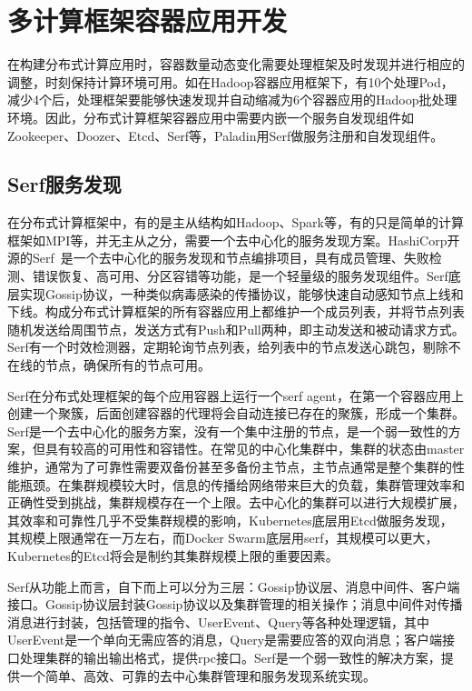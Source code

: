 \section{多计算框架容器应用开发}
在构建分布式计算应用时，容器数量动态变化需要处理框架及时发现并进行相应的调整，时刻保持计算环境可用。如在Hadoop容器应用框架下，有10个处理Pod，减少4个后，处理框架要能够快速发现并自动缩减为6个容器应用的Hadoop批处理环境。因此，分布式计算框架容器应用中需要内嵌一个服务自发现组件如Zookeeper、Doozer、Etcd、Serf等，Paladin用Serf做服务注册和自发现组件。

\subsection{Serf服务发现}
在分布式计算框架中，有的是主从结构如Hadoop、Spark等，有的只是简单的计算框架如MPI等，并无主从之分，需要一个去中心化的服务发现方案。HashiCorp开源的Serf~\cite{Stubbs2015Distributed}是一个去中心化的服务发现和节点编排项目，具有成员管理、失败检测、错误恢复、高可用、分区容错等功能，是一个轻量级的服务发现组件。Serf底层实现Gossip协议，一种类似病毒感染的传播协议，能够快速自动感知节点上线和下线。构成分布式计算框架的所有容器应用上都维护一个成员列表，并将节点列表随机发送给周围节点，发送方式有Push和Pull两种，即主动发送和被动请求方式。Serf有一个时效检测器，定期轮询节点列表，给列表中的节点发送心跳包，剔除不在线的节点，确保所有的节点可用。

Serf在分布式处理框架的每个应用容器上运行一个serf agent，在第一个容器应用上创建一个聚簇，后面创建容器的代理将会自动连接已存在的聚簇，形成一个集群。Serf是一个去中心化的服务方案，没有一个集中注册的节点，是一个弱一致性的方案，但具有较高的可用性和容错性。在常见的中心化集群中，集群的状态由master维护，通常为了可靠性需要双备份甚至多备份主节点，主节点通常是整个集群的性能瓶颈。在集群规模较大时，信息的传播给网络带来巨大的负载，集群管理效率和正确性受到挑战，集群规模存在一个上限。去中心化的集群可以进行大规模扩展，其效率和可靠性几乎不受集群规模的影响，Kubernetes底层用Etcd做服务发现，其规模上限通常在一万左右，而Docker Swarm底层用serf，其规模可以更大，Kubernetes的Etcd将会是制约其集群规模上限的重要因素。

Serf从功能上而言，自下而上可以分为三层：Gossip协议层、消息中间件、客户端接口。Gossip协议层封装Gossip协议以及集群管理的相关操作；消息中间件对传播消息进行封装，包括管理的指令、UserEvent、Query等各种处理逻辑，其中UserEvent是一个单向无需应答的消息，Query是需要应答的双向消息；客户端接口处理集群的输出输出格式，提供rpc接口。Serf是一个弱一致性的解决方案，提供一个简单、高效、可靠的去中心集群管理和服务发现系统实现。

